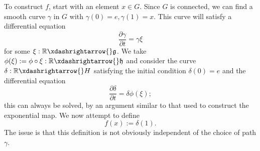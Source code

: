 \documentclass[reqno]{amsart} 
\begin{document}
To construct $f$, start with an element $x \in G$.  Since $G$ is connected, we can find a smooth curve $\gamma$ in $G$ with $\gamma(0) = e, \gamma(1) = x$.  This curve will satisfy a differential equation
\begin{equation*}
  \frac{\partial \gamma }{\partial t} = \gamma \xi
\end{equation*}
for some $\xi : \mathbb{R} \xdashrightarrow{} \mathfrak{g}$.  We take $\phi(\xi) := \phi \circ \xi : \mathbb{R} \xdashrightarrow{} \mathfrak{h}$ and consider the curve $\delta : \mathbb{R} \xdashrightarrow{} H$ satisfying the initial condition $\delta(0) = e$ and the differential equation
\begin{equation*}
  \frac{\partial \delta }{\partial t} = \delta \phi(\xi);
\end{equation*}
this can always be solved, by an argument similar to that used to construct the exponential map.  We now attempt to define
\begin{equation*}
  f(x) := \delta(1).
\end{equation*}
The issue is that this definition is not obviously independent of the choice of path $\gamma$.
\end{document}
